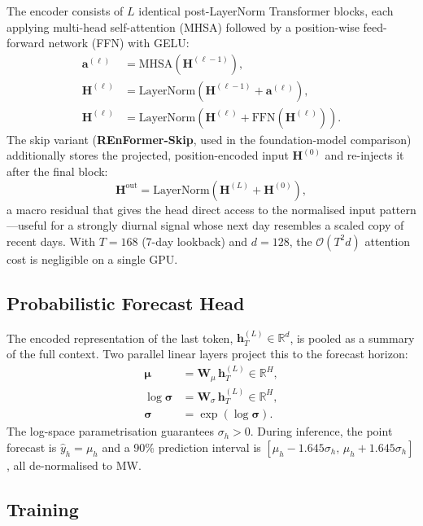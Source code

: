 \documentclass[10pt,twocolumn]{article}
\begin{document}
The encoder consists of $L$ identical post-LayerNorm Transformer blocks,
each applying multi-head self-attention (MHSA) followed by a
position-wise feed-forward network (FFN) with GELU:
\begin{align}
  \mathbf{a}^{(\ell)} &= \text{MHSA}\!\left(\mathbf{H}^{(\ell-1)}\right),\\
  \mathbf{H}^{(\ell)} &= \text{LayerNorm}\!\left(\mathbf{H}^{(\ell-1)}
    + \mathbf{a}^{(\ell)}\right),\\
  \mathbf{H}^{(\ell)} &= \text{LayerNorm}\!\left(\mathbf{H}^{(\ell)}
    + \text{FFN}\!\left(\mathbf{H}^{(\ell)}\right)\right).
\end{align}
The skip variant (\textbf{REnFormer-Skip}, used in the foundation-model
comparison) additionally stores the projected, position-encoded input
$\mathbf{H}^{(0)}$ and re-injects it after the final block:
\begin{equation}
  \mathbf{H}^{\text{out}} = \text{LayerNorm}\!\left(\mathbf{H}^{(L)}
    + \mathbf{H}^{(0)}\right),
\end{equation}
a macro residual that gives the head direct access to the normalised
input pattern---useful for a strongly diurnal signal whose next day
resembles a scaled copy of recent days. With $T = 168$ (7-day lookback)
and $d = 128$, the $\mathcal{O}(T^2 d)$ attention cost is negligible on
a single GPU.

\subsection{Probabilistic Forecast Head}

The encoded representation of the last token,
$\mathbf{h}^{(L)}_T \in \mathbb{R}^d$, is pooled as a summary of the
full context. Two parallel linear layers project this to the forecast
horizon:
\begin{align}
  \boldsymbol{\mu} &= \mathbf{W}_\mu \, \mathbf{h}^{(L)}_T \in \mathbb{R}^H,\\
  \log \boldsymbol{\sigma} &= \mathbf{W}_\sigma \, \mathbf{h}^{(L)}_T \in \mathbb{R}^H,\\
  \boldsymbol{\sigma} &= \exp(\log \boldsymbol{\sigma}).
\end{align}
The log-space parametrisation guarantees $\sigma_h > 0$. During
inference, the point forecast is $\hat{y}_h = \mu_h$ and a 90\%
prediction interval is $[\mu_h - 1.645\sigma_h,\, \mu_h +
1.645\sigma_h]$, all de-normalised to MW.

\subsection{Training}
\end{document}
